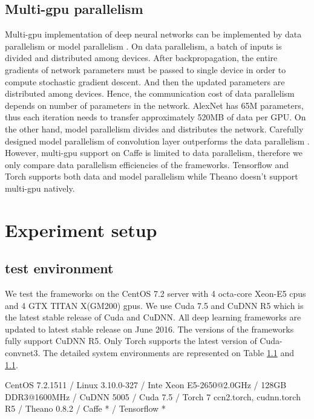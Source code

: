 \documentclass[conference]{IEEEtran}
\begin{document}
\subsection{Multi-gpu parallelism}
Multi-gpu implementation of deep neural networks can be implemented by data parallelism or model parallelism \cite{}.
On data parallelism, a batch of inputs is divided and distributed among devices.
After backpropagation, the entire gradients of network parameters must be passed to single device in order to compute stochastic gradient descent.
And then the updated parameters are distributed among devices.
Hence, the communication cost of data parallelism depends on number of parameters in the network.
AlexNet has 65M parameters, thus each iteration needs to transfer approximately 520MB of data per GPU.
On the other hand, model parallelism divides and distributes the network.
Carefully designed model parallelism of convolution layer outperforms the data parallelism \cite{}.
However, multi-gpu support on Caffe is limited to data parallelism, therefore we only compare data parallelism efficiencies of the frameworks.
Tensorflow and Torch supports both data and model parallelism while Theano doesn’t support multi-gpu natively.

\section{Experiment setup}

\subsection{test environment}
We test the frameworks on the CentOS 7.2 server with 4 octa-core Xeon-E5 cpus and 4 GTX TITAN X(GM200) gpus.
We use Cuda 7.5 and CuDNN R5 which is the latest stable release of Cuda and CuDNN.
All deep learning frameworks are updated to latest stable release on June 2016.
The versions of the frameworks fully support CuDNN R5.
Only Torch supports the latest version of Cuda-convnet3.
The detailed system environments are represented on Table \ref{} and \ref{}.

CentOS 7.2.1511 / Linux 3.10.0-327 / Inte Xeon E5-2650@2.0GHz / 128GB DDR3@1600MHz / CuDNN 5005 / Cuda 7.5 / Torch 7 ccn2.torch, cudnn.torch R5 / Theano 0.8.2 / Caffe * / Tensorflow *
\end{document}
